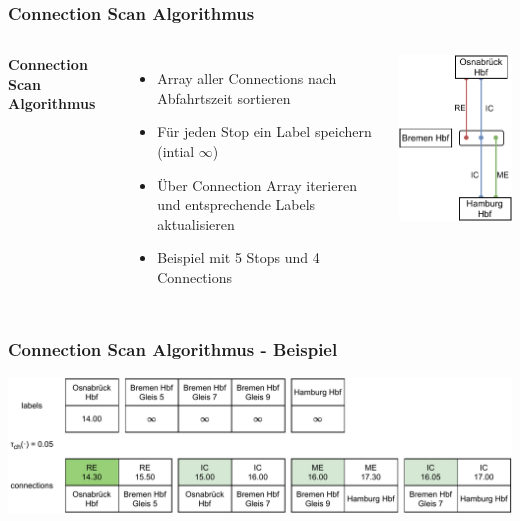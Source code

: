 \documentclass[aspectratio=169]{beamer}
\begin{document}
\begin{frame}
\frametitle{Connection Scan Algorithmus}
\begin{columns}[c] %
	
	\textbf{Connection Scan Algorithmus}
	\begin{itemize}
		\item Array aller Connections nach Abfahrtszeit sortieren
		\item Für jeden Stop ein Label speichern (intial $\infty$)
		\item Über Connection Array iterieren und entsprechende Labels aktualisieren
		\item Beispiel mit 5 Stops und 4 Connections
	\end{itemize}
	\includegraphics[scale=1]{csa_instance.pdf}
	
\end{columns}
\end{frame}


\begin{frame}
\frametitle{Connection Scan Algorithmus - Beispiel}
\centering
\includegraphics[scale=.7]{csa0.pdf}
\end{frame}
\end{document}
